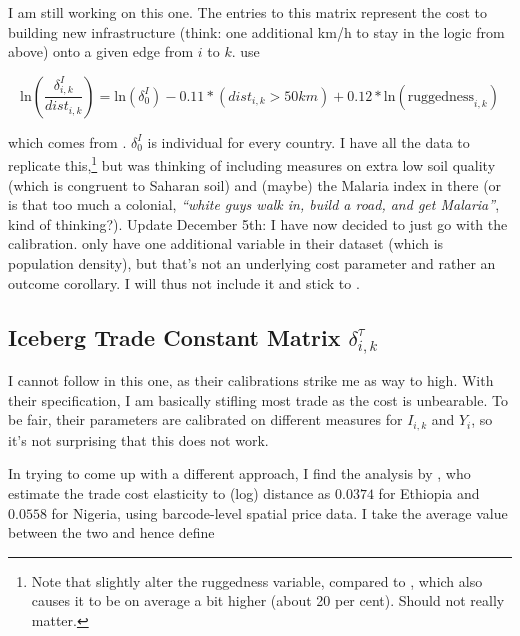 \documentclass[11pt, oneside]{article}   	%
\begin{document}
I am still working on this one. The entries to this matrix represent the cost to building new infrastructure (think: one additional km/h to stay in the logic from above) onto a given edge from $i$ to $k$. \citeauthor{fajgelbaum_optimal_2017} use

\begin{equation}
  \textrm{ln}(\frac{\delta^{I}_{i,k}}{dist_{i,k}}) = \textrm{ln}(\delta_{0}^{I}) - 0.11*(dist_{i,k} > 50km) + 0.12*\textrm{ln}(\textrm{ruggedness}_{i,k})
\end{equation}

which comes from \cite{collier_cost_2015}. $\delta_{0}^{I}$ is individual for every country. I have all the data to replicate this,\footnote{Note that \citeauthor{henderson_global_2018} slightly alter the ruggedness variable, compared to \cite{nunn_ruggedness:_2012}, which also causes it to be on average a bit higher (about 20 per cent). Should not really matter.} but was thinking of including measures on extra low soil quality (which is congruent to Saharan soil) and (maybe) the Malaria index in there (or is that too much a colonial, \textit{``white guys walk in, build a road, and get Malaria''}, kind of thinking?). Update December 5th: I have now decided to just go with the \citeauthor{fajgelbaum_optimal_2017} calibration. \cite{collier_cost_2015} only have one additional variable in their dataset (which is population density), but that's not an underlying cost parameter and rather an outcome corollary. I will thus not include it and stick to \citeauthor{fajgelbaum_optimal_2017}.

\subsection{Iceberg Trade Constant Matrix $\delta^{\tau}_{i,k}$}

I cannot follow \citeauthor{fajgelbaum_optimal_2017} in this one, as their calibrations strike me as way to high. With their specification, I am basically stifling most trade as the cost is unbearable. To be fair, their parameters are calibrated on different measures for $I_{i,k}$ and $Y_{i}$, so it's not surprising that this does not work.

In trying to come up with a different approach, I find the analysis by \cite{atkin_whos_2015}, who estimate the trade cost elasticity to (log) distance as $0.0374$ for Ethiopia and $0.0558$ for Nigeria, using barcode-level spatial price data. I take the average value between the two and hence define
\end{document}

